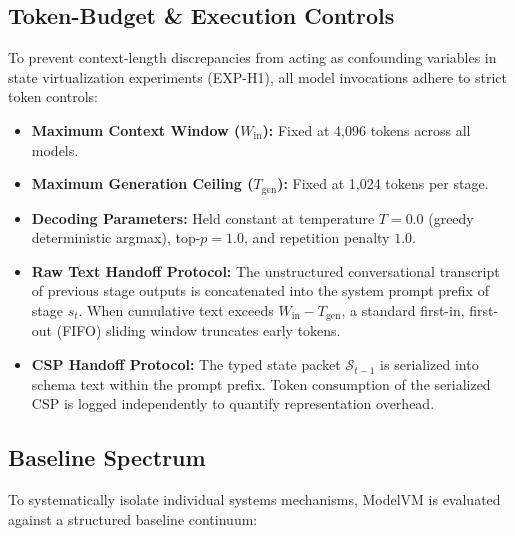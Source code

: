 \subsection{Token-Budget \& Execution Controls}
\label{sec:token_controls}

To prevent context-length discrepancies from acting as confounding variables in state virtualization experiments (EXP-H1), all model invocations adhere to strict token controls:
\begin{itemize}
    \item \textbf{Maximum Context Window ($W_{\text{in}}$):} Fixed at 4,096 tokens across all models.
    \item \textbf{Maximum Generation Ceiling ($T_{\text{gen}}$):} Fixed at 1,024 tokens per stage.
    \item \textbf{Decoding Parameters:} Held constant at temperature $T = 0.0$ (greedy deterministic argmax), top-$p = 1.0$, and repetition penalty $1.0$.
    \item \textbf{Raw Text Handoff Protocol:} The unstructured conversational transcript of previous stage outputs is concatenated into the system prompt prefix of stage $s_t$. When cumulative text exceeds $W_{\text{in}} - T_{\text{gen}}$, a standard first-in, first-out (FIFO) sliding window truncates early tokens.
    \item \textbf{CSP Handoff Protocol:} The typed state packet $\mathcal{S}_{t-1}$ is serialized into schema text within the prompt prefix. Token consumption of the serialized CSP is logged independently to quantify representation overhead.
\end{itemize}

\subsection{Baseline Spectrum}
\label{sec:baselines}

To systematically isolate individual systems mechanisms, ModelVM is evaluated against a structured baseline continuum:


